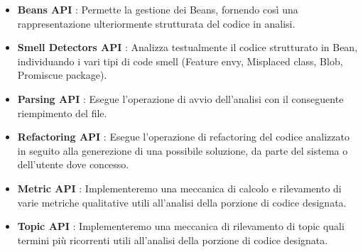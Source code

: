 \begin{itemize}
	\item \textbf{Beans API} : Permette la gestione dei Beans, fornendo così una rappresentazione ulteriormente strutturata del codice in analisi.
	\item \textbf{Smell Detectors API} : Analizza testualmente il codice strutturato in Bean, individuando i vari tipi di code smell (Feature envy, Misplaced class, Blob, Promiscue package).
	\item \textbf{Parsing API} : Esegue l'operazione di avvio dell'analisi con il conseguente riempimento del file. 
 	\item \textbf{Refactoring API} : Esegue l'operazione di refactoring del codice analizzato in seguito alla generezione di una possibile soluzione, da parte del sistema o dell'utente dove concesso. 	
	\item \textbf{Metric API} : Implementeremo una meccanica di calcolo e rilevamento di varie metriche qualitative utili all'analisi della porzione di codice designata.
	\item \textbf{Topic API} : Implementeremo una meccanica di rilevamento di topic quali termini più ricorrenti utili all'analisi della porzione di codice designata.
	
\end{itemize}



